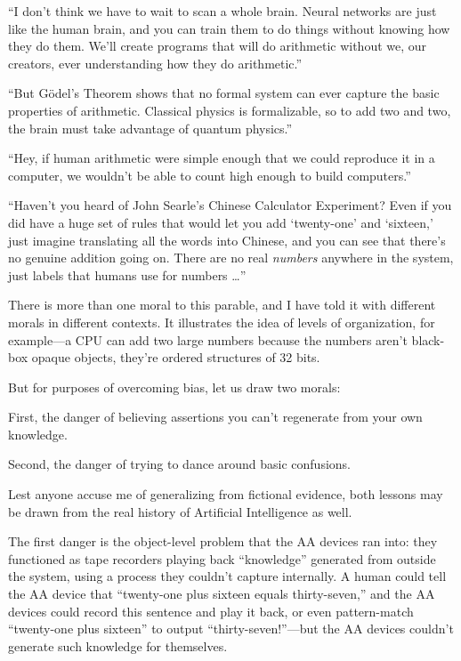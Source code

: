 {
 ``I don't think we have to wait
to scan a whole brain. Neural networks are just like the human brain,
and you can train them to do things without knowing how they do them.
We'll create programs that will do arithmetic without
we, our creators, ever understanding how they do
arithmetic.''}

{
 ``But Gödel's Theorem shows that
no formal system can ever capture the basic properties of arithmetic.
Classical physics is formalizable, so to add two and two, the brain
must take advantage of quantum physics.''}

{
 ``Hey, if human arithmetic were simple enough
that we could reproduce it in a computer, we wouldn't
be able to count high enough to build computers.''}

{
 ``Haven't you heard of John
Searle's Chinese Calculator Experiment? Even if you did
have a huge set of rules that would let you add
`twenty-one' and
`sixteen,' just imagine translating all
the words into Chinese, and you can see that there's no
genuine addition going on. There are no real \textit{numbers} anywhere
in the system, just labels that humans use for numbers
\ldots''}

{
 There is more than one moral to this parable, and I have told it
with different morals in different contexts. It illustrates the idea of
levels of organization, for example---a CPU can add two large numbers
because the numbers aren't black-box opaque objects,
they're ordered structures of 32 bits.}

{
 But for purposes of overcoming bias, let us draw two morals:}

{
 First, the danger of believing assertions you
can't regenerate from your own knowledge.}

{
 Second, the danger of trying to dance around basic confusions.}

{
 Lest anyone accuse me of generalizing from fictional evidence,
both lessons may be drawn from the real history of Artificial
Intelligence as well.}

{
 The first danger is the object-level problem that the AA devices
ran into: they functioned as tape recorders playing back
``knowledge'' generated from outside
the system, using a process they couldn't capture
internally. A human could tell the AA device that
``twenty-one plus sixteen equals
thirty-seven,'' and the AA devices could record this
sentence and play it back, or even pattern-match
``twenty-one plus sixteen'' to
output ``thirty-seven!''---but the
AA devices couldn't generate such knowledge for
themselves.}

